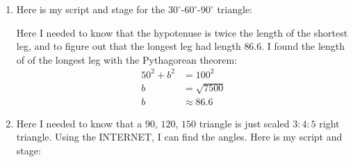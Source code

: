 \documentclass[handout,noauthor,nooutcomes]{../ximera}
\begin{document}
\begin{question}
\begin{freeResponse}
\begin{enumerate}
    \item Here is my script and stage for the $30^\circ$-$60^\circ$-$90^\circ$ triangle:
      \begin{center}
        \qquad
      \end{center}
      Here I needed to know that the hypotenuse is twice the length of
      the shortest leg, and to figure out that the longest leg had
      length $86.6$.  I found the length of of the longest leg with
      the Pythagorean theorem:
      \begin{align*}
      50^2 + b^2 &= 100^2\\
      b &= \sqrt{7500}\\
      b &\approx 86.6
      \end{align*}
    
    \item Here I needed to know that a $90$, $120$, $150$ triangle is
      just scaled $3:4:5$ right triangle. Using the INTERNET, I can
      find the angles.  Here is my script and stage:
      \begin{center}
        \qquad
      \end{center}
    \end{enumerate}
  \end{freeResponse}
\end{question}
\end{document}

